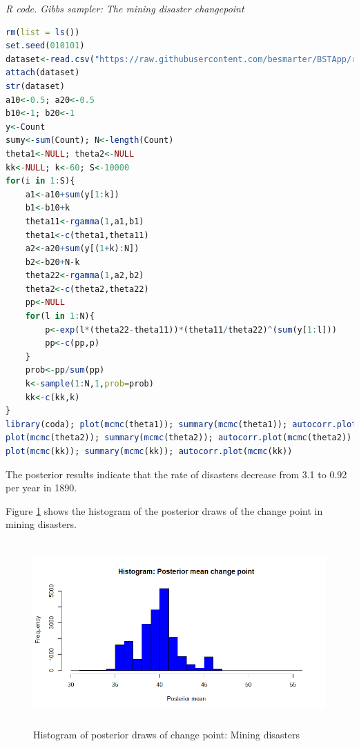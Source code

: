 \begin{tcolorbox}[enhanced,width=4.67in,center upper,
	fontupper=\large\bfseries,drop shadow southwest,sharp corners]
	\textit{R code. Gibbs sampler: The mining disaster changepoint}
	\begin{VF}
		\begin{lstlisting}[language=R]
rm(list = ls())
set.seed(010101)
dataset<-read.csv("https://raw.githubusercontent.com/besmarter/BSTApp/refs/heads/master/DataApp/MiningDataCarlin.csv",header=T)
attach(dataset)
str(dataset)
a10<-0.5; a20<-0.5
b10<-1; b20<-1
y<-Count
sumy<-sum(Count); N<-length(Count)
theta1<-NULL; theta2<-NULL
kk<-NULL; k<-60; S<-10000
for(i in 1:S){
	a1<-a10+sum(y[1:k])
	b1<-b10+k
	theta11<-rgamma(1,a1,b1)
	theta1<-c(theta1,theta11)
	a2<-a20+sum(y[(1+k):N])
	b2<-b20+N-k
	theta22<-rgamma(1,a2,b2)
	theta2<-c(theta2,theta22)
	pp<-NULL
	for(l in 1:N){
		p<-exp(l*(theta22-theta11))*(theta11/theta22)^(sum(y[1:l]))
		pp<-c(pp,p)
	}
	prob<-pp/sum(pp)
	k<-sample(1:N,1,prob=prob)
	kk<-c(kk,k)
}
library(coda); plot(mcmc(theta1)); summary(mcmc(theta1)); autocorr.plot(mcmc(theta1))
plot(mcmc(theta2)); summary(mcmc(theta2)); autocorr.plot(mcmc(theta2))
plot(mcmc(kk)); summary(mcmc(kk)); autocorr.plot(mcmc(kk))
\end{lstlisting}
	\end{VF}
\end{tcolorbox} 

The posterior results indicate that the rate of disasters decrease from 3.1 to 0.92 per year in 1890. 

Figure \ref{fig52} shows the histogram of the posterior draws of the change point in mining disasters. 

\begin{figure}[!h]
	\includegraphics[width=340pt, height=200pt]{Chapters/chapter5/figures/Mining.png}
	\caption[List of figure caption goes here]{Histogram of posterior draws of change point: Mining disasters}\label{fig52}
\end{figure} 

